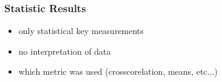 \subsubsection{Statistic Results}

\begin{itemize}
	\item only statistical key measurements
	\item no interpretation of data
	\item which metric was used (crosscorelation, means, etc...)
\end{itemize}